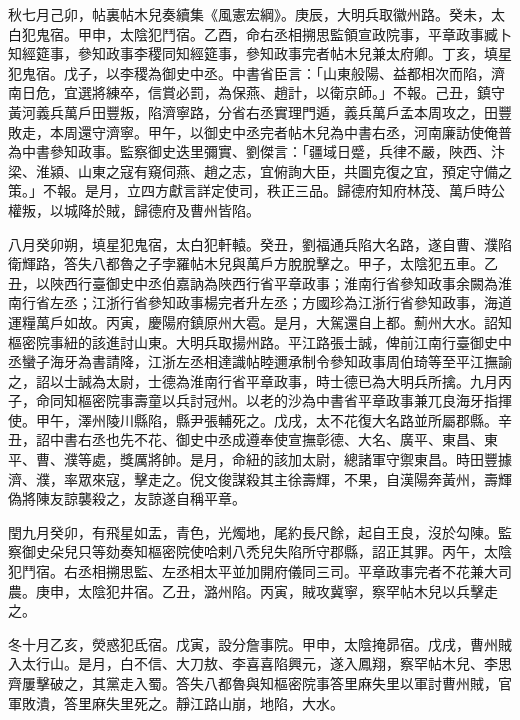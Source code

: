 \begin{pinyinscope}
 秋七月己卯，帖裏帖木兒奏續集《風憲宏綱》。庚辰，大明兵取徽州路。癸未，太白犯鬼宿。甲申，太陰犯鬥宿。乙酉，命右丞相搠思監領宣政院事，平章政事臧卜知經筵事，參知政事李稷同知經筵事，參知政事完者帖木兒兼太府卿。丁亥，填星犯鬼宿。戊子，以李稷為御史中丞。中書省臣言：「山東般陽、益都相次而陷，濟南日危，宜選將練卒，信賞必罰，為保燕、趙計，以衛京師。」不報。己丑，鎮守黃河義兵萬戶田豐叛，陷濟寧路，分省右丞實理門遁，義兵萬戶孟本周攻之，田豐敗走，本周還守濟寧。甲午，以御史中丞完者帖木兒為中書右丞，河南廉訪使俺普為中書參知政事。監察御史迭里彌實、劉傑言：「疆域日蹙，兵律不嚴，陜西、汴梁、淮潁、山東之寇有窺伺燕、趙之志，宜俯詢大臣，共圖克復之宜，預定守備之策。」不報。是月，立四方獻言詳定使司，秩正三品。歸德府知府林茂、萬戶時公權叛，以城降於賊，歸德府及曹州皆陷。



 八月癸卯朔，填星犯鬼宿，太白犯軒轅。癸丑，劉福通兵陷大名路，遂自曹、濮陷衛輝路，答失八都魯之子孛羅帖木兒與萬戶方脫脫擊之。甲子，太陰犯五車。乙丑，以陜西行臺御史中丞伯嘉訥為陜西行省平章政事；淮南行省參知政事余闕為淮南行省左丞；江浙行省參知政事楊完者升左丞；方國珍為江浙行省參知政事，海道運糧萬戶如故。丙寅，慶陽府鎮原州大雹。是月，大駕還自上都。薊州大水。詔知樞密院事紐的該進討山東。大明兵取揚州路。平江路張士誠，俾前江南行臺御史中丞蠻子海牙為書請降，江浙左丞相達識帖睦邇承制令參知政事周伯琦等至平江撫諭之，詔以士誠為太尉，士德為淮南行省平章政事，時士德已為大明兵所擒。九月丙子，命同知樞密院事壽童以兵討冠州。以老的沙為中書省平章政事兼兀良海牙指揮使。甲午，澤州陵川縣陷，縣尹張輔死之。戊戌，太不花復大名路並所屬郡縣。辛丑，詔中書右丞也先不花、御史中丞成遵奉使宣撫彰德、大名、廣平、東昌、東平、曹、濮等處，獎厲將帥。是月，命紐的該加太尉，總諸軍守禦東昌。時田豐據濟、濮，率眾來寇，擊走之。倪文俊謀殺其主徐壽輝，不果，自漢陽奔黃州，壽輝偽將陳友諒襲殺之，友諒遂自稱平章。



 閏九月癸卯，有飛星如盂，青色，光燭地，尾約長尺餘，起自王良，沒於勾陳。監察御史朵兒只等劾奏知樞密院使哈剌八禿兒失陷所守郡縣，詔正其罪。丙午，太陰犯鬥宿。右丞相搠思監、左丞相太平並加開府儀同三司。平章政事完者不花兼大司農。庚申，太陰犯井宿。乙丑，潞州陷。丙寅，賊攻冀寧，察罕帖木兒以兵擊走之。



 冬十月乙亥，熒惑犯氐宿。戊寅，設分詹事院。甲申，太陰掩昴宿。戊戌，曹州賊入太行山。是月，白不信、大刀敖、李喜喜陷興元，遂入鳳翔，察罕帖木兒、李思齊屢擊破之，其黨走入蜀。答失八都魯與知樞密院事答里麻失里以軍討曹州賊，官軍敗潰，答里麻失里死之。靜江路山崩，地陷，大水。




\end{pinyinscope}
